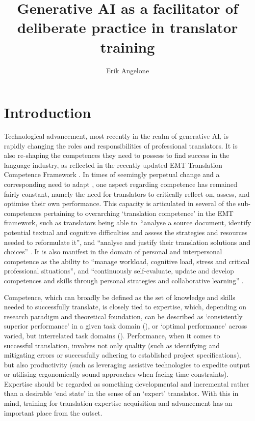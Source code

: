 \documentclass[output=paper]{langscibook}
\author{Erik Angelone\orcid{}\affiliation{TH Köln University of Applied Sciences, Germany}}
\title{Generative AI as a facilitator of deliberate practice in translator training}
\begin{document}
\maketitle


\section{Introduction}\label{sec:2:1}

Technological advancement, most recently in the realm of generative AI, is rapidly changing the roles and responsibilities of professional translators. It is also re-shaping the competences they need to possess to find success in the language industry, as reflected in the recently updated EMT Translation Competence Framework \citep{emt_european_2022}. In times of seemingly perpetual change and a corresponding need to adapt \citep{angelone_weaving_2023}, one aspect regarding competence has remained fairly constant, namely the need for translators to critically reflect on, assess, and optimise their own performance. This capacity is articulated in several of the sub-competences pertaining to overarching ‘translation competence’ in the EMT framework, such as translators being able to~“analyse a source document, identify potential textual and cognitive difficulties and assess the strategies and resources needed to reformulate it”, and “analyse and justify their translation solutions and choices” \citep[8]{emt_european_2022}. It is also manifest in the domain of personal and interpersonal competence as the ability to “manage workload, cognitive load, stress and critical professional situations”, and “continuously self-evaluate, update and develop competences and skills through personal strategies and collaborative learning” \citep[10]{emt_european_2022}.

Competence, which can broadly be defined as the set of knowledge and skills needed to successfully translate, is closely tied to expertise, which, depending on research paradigm and theoretical foundation, can be described as ‘consistently superior performance’ in a given task domain (\citealt{ericssoncharness94}), or ‘optimal performance’ across varied, but interrelated task domains (\citealt{hatanoinagaki86}). Performance, when it comes to successful translation, involves not only quality (such as identifying and mitigating errors or successfully adhering to established project specifications), but also productivity (such as leveraging assistive technologies to expedite output or utilising ergonomically sound approaches when facing time constraints). Expertise should be regarded as something developmental and incremental \citep{shreve2018} rather than a desirable ‘end state’ in the sense of an ‘expert’ translator. With this in mind, training for translation expertise acquisition and advancement has an important place from the outset.
\end{document}
